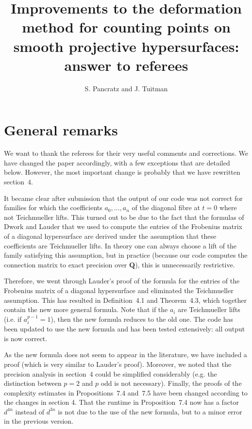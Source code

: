 \documentclass{article}
\title{Improvements to the deformation method for counting points on smooth projective hypersurfaces: answer to referees}
\author{S. Pancratz and J. Tuitman}
\begin{document}
\maketitle

\section*{General remarks}

We want to thank the referees for their very useful comments and corrections. We have changed the paper accordingly, with a few
exceptions that are detailed below. 
However, the most important change is probably that we have rewritten section~$4$.

It became clear
after submission that the output of our code was not correct for families for which the coefficients $a_0,\ldots,a_n$ of the diagonal fibre 
at $t=0$ where not Teichmueller lifts. This turned out to be due to the fact that the formulas of Dwork and Lauder that we used to compute
the entries of the Frobenius matrix of a diagonal hypersurface are derived under the assumption that these coefficients are Teichmueller lifts. In 
theory one can always choose a lift of the family satisfying this assumption, but in practice (because our code computes the connection
matrix to exact precision over $\mathbf{Q}$), this is unnecessarily restrictive.

Therefore, we went through Lauder's proof of the formula for the entries of the Frobenius matrix of a diagonal hypersurface and eliminated
the Teichmueller assumption. This has resulted in Definition~4.1 and Theorem~4.3, which together contain the new more general formula. 
Note that if the $a_i$ are Teichmueller lifts (i.e. if $a_i^{p-1}=1$), then the new formula reduces to the old one. The code has been updated 
to use the new formula and has been tested extensively: all output is now correct. 

As the new formula does not seem to appear in the literature,
we have included a proof (which is very similar to Lauder's proof). Moreover, we noted that the precision analysis in section~4 could be simplified considerably (e.g.
the distinction between $p=2$ and $p$ odd is not necessary). Finally, the proofs of the complexity estimates in Propositions~7.4 and~7.5 
have been changed according to the changes in section 4. That the runtime in Proposition~7.4 now has a factor $d^{4n}$ instead of $d^{3n}$ is not due to the use of the new
formula, but to a minor error in the previous version. 
\end{document}
